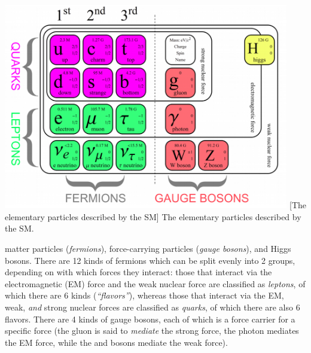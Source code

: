 \begin{multiFigure}
    \centering
        \includegraphics[height=9cm,keepaspectratio]{figures/sm/particular_table_updated.png}
        [The elementary particles described by the SM]
        {The elementary particles described by the SM.}
    \label{fig:particular_table}
\end{multiFigure}
matter particles (\emph{fermions}), force-carrying particles (\emph{gauge bosons}), and Higgs bosons.
There are 12 kinds of fermions which can be split evenly into 2 groups, depending on with which forces they interact:
those that interact via the electromagnetic (EM) force and the weak nuclear force are classified as \emph{leptons}, of which there are 6 kinds (\emph{``flavors''}),
whereas those that interact via the EM, weak, \emph{and} strong nuclear forces are classified as \emph{quarks}, of which there are also 6 flavors.
There are 4 kinds of gauge bosons, each of which is a force carrier for a specific force
(the gluon is said to \emph{mediate} the strong force, the photon mediates the EM force, while the \PWpm and \PZ bosons mediate the weak force).
